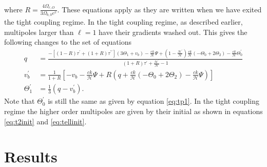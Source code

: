 \documentclass[onecolumn]{aastex62}
\begin{document}
where $R = \frac{4\Omega_{r,O}}{3\Omega_{b,0}e^x}$. These equations apply as they are written when we have exited the tight coupling regime. In the tight coupling regime, as described earlier, multipoles larger than $\ell=1$ have their gradients washed out. This gives the following changes to the set of equations 
\begin{align}
    q &= \frac{-[(1-R)\tau^\prime + (1+R)\tau^{\prime\prime}](3\Theta_1+v_b) -
    \frac{ck}{\mathcal{H}}\Psi + (1-\frac{\mathcal{H}^\prime}{\mathcal{H}})\frac{ck}{\mathcal{H}}(-\Theta_0 +
    2\Theta_2) - \frac{ck}{\mathcal{H}}\Theta_0^\prime}{(1+R)\tau^\prime + \frac{\mathcal{H}^\prime}{\mathcal{H}} -
    1}\\
    v_b^\prime &= \frac{1}{1+R} \left[-v_b - \frac{ck}{\mathcal{H}}\Psi + R(q +
    \frac{ck}{\mathcal{H}}(-\Theta_0 + 2\Theta_2) - \frac{ck}{\mathcal{H}}\Psi)\right]\\
    \Theta^\prime_1 &= \frac{1}{3} (q - v_b^\prime).
\end{align}
Note that $\Theta^\prime_0$ is still the same as given by equation \ref{eq:tp1}.  In the tight coupling regime the higher order multipoles are given by their initial as shown in equations \ref{eq:t2init} and \ref{eq:tellinit}.
\section{Results}
\label{sec:results}




\end{document}
